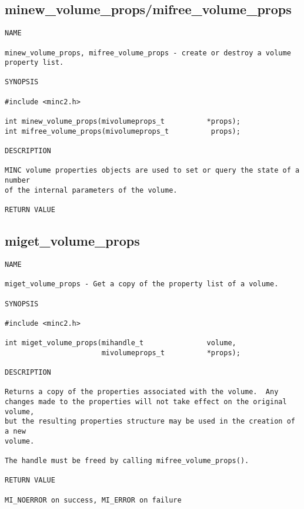 \documentclass{article}
\begin{document}
\subsection{minew\_volume\_props/mifree\_volume\_props}
\begin{verbatim}
NAME

minew_volume_props, mifree_volume_props - create or destroy a volume
property list.

SYNOPSIS

#include <minc2.h>

int minew_volume_props(mivolumeprops_t          *props);
int mifree_volume_props(mivolumeprops_t          props);

DESCRIPTION

MINC volume properties objects are used to set or query the state of a number
of the internal parameters of the volume.

RETURN VALUE
\end{verbatim}

\subsection{miget\_volume\_props}
\begin{verbatim}
NAME

miget_volume_props - Get a copy of the property list of a volume.

SYNOPSIS

#include <minc2.h>

int miget_volume_props(mihandle_t               volume, 
                       mivolumeprops_t          *props);

DESCRIPTION

Returns a copy of the properties associated with the volume.  Any
changes made to the properties will not take effect on the original volume,
but the resulting properties structure may be used in the creation of a new
volume.

The handle must be freed by calling mifree_volume_props().

RETURN VALUE

MI_NOERROR on success, MI_ERROR on failure
\end{verbatim}
\end{document}
